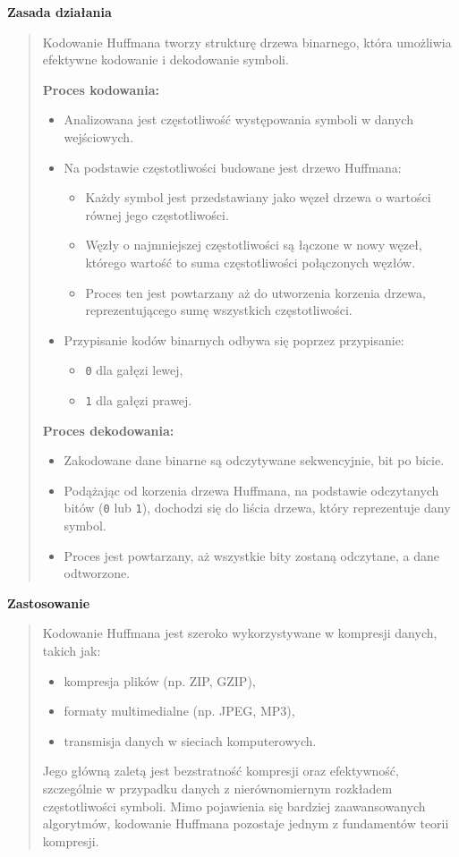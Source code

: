 \documentclass[12pt,a4paper]{article}
\begin{document}
\noindent\textbf{Zasada działania}
\begin{quotation}\noindent Kodowanie Huffmana tworzy strukturę drzewa binarnego, która umożliwia efektywne kodowanie i dekodowanie symboli.

\noindent\textbf{Proces kodowania:}
\begin{itemize}
\item Analizowana jest częstotliwość występowania symboli w danych wejściowych.
\item Na podstawie częstotliwości budowane jest drzewo Huffmana:
\begin{itemize}
\item Każdy symbol jest przedstawiany jako węzeł drzewa o wartości równej jego częstotliwości.
\item Węzły o najmniejszej częstotliwości są łączone w nowy węzeł, którego wartość to suma częstotliwości połączonych węzłów.
\item Proces ten jest powtarzany aż do utworzenia korzenia drzewa, reprezentującego sumę wszystkich częstotliwości.
\end{itemize}
\item Przypisanie kodów binarnych odbywa się poprzez przypisanie:
\begin{itemize}
\item \texttt{0} dla gałęzi lewej,
\item \texttt{1} dla gałęzi prawej.
\end{itemize}
\end{itemize}

\noindent\textbf{Proces dekodowania:}
\begin{itemize}
\item Zakodowane dane binarne są odczytywane sekwencyjnie, bit po bicie.
\item Podążając od korzenia drzewa Huffmana, na podstawie odczytanych bitów (\texttt{0} lub \texttt{1}), dochodzi się do liścia drzewa, który reprezentuje dany symbol.
\item Proces jest powtarzany, aż wszystkie bity zostaną odczytane, a dane odtworzone.
\end{itemize}
\end{quotation}

\noindent\textbf{Zastosowanie}
\begin{quotation}\noindent Kodowanie Huffmana jest szeroko wykorzystywane w kompresji danych, takich jak:
\begin{itemize}
\item kompresja plików (np. ZIP, GZIP),
\item formaty multimedialne (np. JPEG, MP3),
\item transmisja danych w sieciach komputerowych.
\end{itemize}
Jego główną zaletą jest bezstratność kompresji oraz efektywność, szczególnie w przypadku danych z nierównomiernym rozkładem częstotliwości symboli. Mimo pojawienia się bardziej zaawansowanych algorytmów, kodowanie Huffmana pozostaje jednym z fundamentów teorii kompresji.
\end{quotation}
\end{document}
